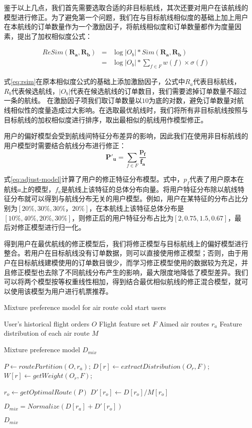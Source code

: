 鉴于以上几点，我们首先需要选取合适的非目标航线，其次还要对用户在该航线的模型进行修正。为了避免第一个问题，我们在与目标航线相似度的基础上加上用户在本航线的订单数量作为一个激励因子，将航线相似度和订单数量都作为度量因素，提出了加权相似度公式：

\begin{eqnarray}
\label{eq:rsim}
	ReSim(\mathbf{R_a,R_b}) & = & \log{|O_b|} * Sim(\mathbf{R_a,R_b})  \nonumber \\
                        & = & \log{|O_b|} * \sum_{f \in F}w(f) \times \sigma(f)
\end{eqnarray}

式\ref{eq:rsim}在原本相似度公式的基础上添加激励因子，公式中$R_a$代表目标航线，$R_b$代表候选航线，$|O_b|$代表在候选航线的订单数目，我们需要滤掉订单数量不超过一条的航线。
在激励因子项我们取订单数量以$10$为底的对数，避免订单数量对航线相似性的度量造成过大影响。在选取最优航线时，我们将所有非目标航线按照与目标航线的加权相似度进行排序，取出最相似的航线用作模型修正。

用户的偏好模型会受到航线间特征分布差异的影响，因此我们在使用非目标航线的用户模型时需要结合航线分布进行修正：
\begin{equation}
\label{eq:adjust-model}
	\mathbf{P'_u} = \sum_{f \in F} \frac{\mathbf{p_f}}{\mathbf{f_a}}
\end{equation}

式\ref{eq:adjust-model}计算了用户的修正特征分布模型。式中，$p_f$代表了用户原本在航线$a$上的模型，$f_a$是航线上该特征的总体分布向量。将用户特征分布除以航线特征分布就可以得到与航线分布无关的用户模型。例如，用户在某特征的分布占比分别为$[20\%,30\%,30\%，20\%]$，在本航线上该特征总体分布是$[10\%,40\%,20\%,30\%]$，则修正后的用户特征分布占比为$[2,0.75,1.5,0.67]$，最后对修正模型进行归一化。

得到用户在最优航线的修正模型后，我们将修正模型与目标航线上的偏好模型进行整合。若用户在目标航线没有订单数据，则可以直接使用修正模型；否则，由于用户在目标航线建模使用的订单数目很少，而学习修正模型使用的数据较为充足，并且修正模型也去除了不同航线分布产生的影响，最大限度地降低了模型差异。我们可以将两个模型按等权重线性相加，得到结合最优相似航线的修正混合模型，就可以使用该模型为用户进行机票推荐。

\begin{algorithm}
\caption{Mixture preference model for air route cold start users}
\label{algo:air_cold_dis}
\begin{algorithmic}[1]
\Require
\Statex User's historical flight orders $O$
\Statex Flight feature set $F$
\Statex Aimed air routes $r_a$
\Statex Feature distribution of each air route $M$

\Ensure 
\Statex Mixture preference model $D_{mix}$

\State $P \gets routePartition(O,r_a)$;
\State $D[r] \gets extractDistribution(O_r,F)$;
\State $W[r] \gets getWeight(O_r,F)$;
\EndFor

\State $r_o \gets getOptimalRoute(P)$
\State $D'[r_o] \gets D[r_o] / M[r_o]$

\State $D_{mix} = Normalize(D[r_a] + D'[r_o])$

\State \Return $D_{mix}$
\end{algorithmic}
\end{algorithm}

